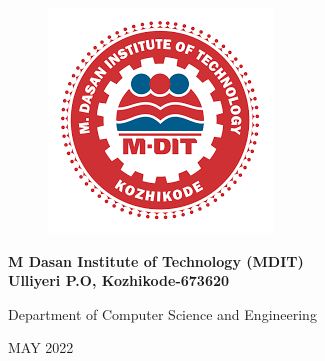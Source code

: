 \documentclass[12pt]{article}
\begin{document}
\begin{figure}[H]
\begin{center}
\includegraphics[scale=.5]{MDIT1}
\end{center} 
\end{figure}
\vspace{0.001cm}
\thispagestyle{empty}
\begin{center}\large \bf{M Dasan Institute of Technology (MDIT) \\
Ulliyeri P.O, Kozhikode-673620} \end{center}
\vspace*{0.001cm}
\begin{center}Department of Computer Science and Engineering \end{center}
\vspace{0.001cm}
\begin{center}MAY 2022\end{center}


















\newpage
\end{document}
